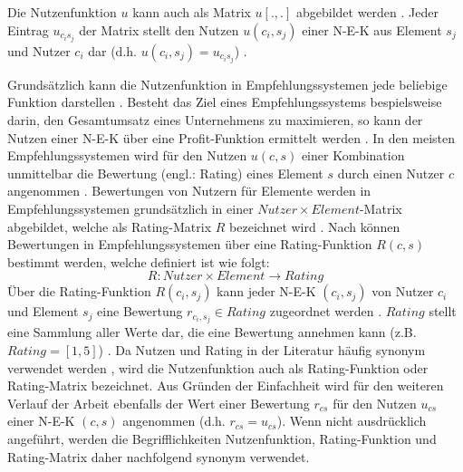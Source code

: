 Die Nutzenfunktion $u$ kann auch als Matrix $u[.,.]$ abgebildet werden \cite[S. 1]{dekhtyar:misc}.
Jeder Eintrag $u_{c_{i}s_{j}}$ der Matrix stellt den Nutzen $u(c_{i},s_{j})$ einer \ac{N-E-K} aus Element $s_{j}$ und Nutzer $c_{i}$ dar (d.h. $u(c_{i},s_{j}) = u_{c_{i}s_{j}}$) \cite[S. 1]{dekhtyar:misc}.

Grundsätzlich kann die Nutzenfunktion in Empfehlungssystemen jede beliebige Funktion darstellen \cite[S. 735]{adomavicius:inproceedings}.
Besteht das Ziel eines Empfehlungssystems bespielsweise darin, den Gesamtumsatz eines Unternehmens zu maximieren, so kann der Nutzen einer \ac{N-E-K} über eine Profit-Funktion ermittelt werden \cite[S. 735]{adomavicius:inproceedings}\cite[S. 11]{recommenderSystems:2016}\cite[S. 1]{jannach:article}\cite[S. 896]{adomavicius:article}.
In den meisten Empfehlungssystemen wird für den Nutzen $u(c,s)$ einer Kombination unmittelbar die Bewertung (engl.: Rating) eines Element $s$ durch einen Nutzer $c$ angenommen \cite[S. 735]{adomavicius:inproceedings}\cite[S. 9]{ricci:inbook}\cite[S. 11]{recommenderSystems:2016}\cite[S. 1]{dekhtyar:misc}.
Bewertungen von Nutzern für Elemente werden in Empfehlungssystemen grundsätzlich in einer $Nutzer \times Element$-Matrix abgebildet, welche als Rating-Matrix $R$ bezeichnet wird \cite[S. 87]{ekstrand:article}.
Nach \textcite[S. 48f.]{adomavicius:inproceedings:2} können Bewertungen in Empfehlungssystemen über eine Rating-Funktion $R(c,s)$ bestimmt werden, welche definiert ist wie folgt:
\begin{equation}
    R: Nutzer \times Element \rightarrow Rating
\end{equation}
Über die Rating-Funktion $R(c_{i},s_{j})$ kann jeder \ac{N-E-K} $(c_{i},s_{j})$ von Nutzer $c_{i}$ und Element $s_{j}$ eine Bewertung $r_{c_{i},s_{j}} \in Rating$ zugeordnet werden \cite[S. 42]{ning:inbook}.
$Rating$ stellt eine Sammlung aller Werte dar, die eine Bewertung annehmen kann (z.B. $Rating = [1,5]$) \cite[S. 41]{ning:inbook}.
Da Nutzen und Rating in der Literatur häufig synonym verwendet werden \cite[S. 11]{recommenderSystems:2016}, wird die Nutzenfunktion auch als Rating-Funktion \cite[S. 49]{adomavicius:inproceedings:2} oder Rating-Matrix \cite[S. 87]{ekstrand:article} bezeichnet.
Aus Gründen der Einfachheit wird für den weiteren Verlauf der Arbeit ebenfalls der Wert einer Bewertung $r_{cs}$ für den Nutzen $u_{cs}$ einer \ac{N-E-K} $(c,s)$ angenommen (d.h. $r_{cs} = u_{cs}$).
Wenn nicht ausdrücklich angeführt, werden die Begrifflichkeiten Nutzenfunktion, Rating-Funktion und Rating-Matrix daher nachfolgend synonym verwendet.

